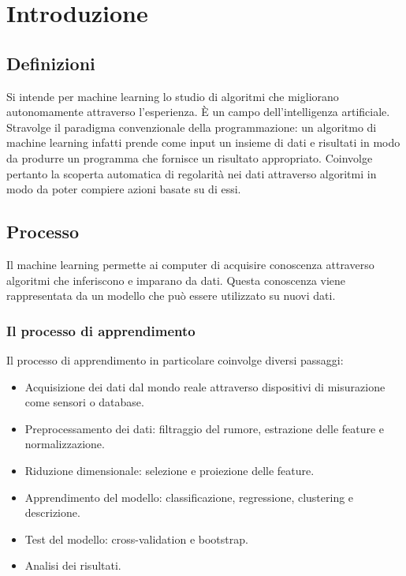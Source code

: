 \chapter{Introduzione}

\section{Definizioni}
Si intende per machine learning lo studio di algoritmi che migliorano autonomamente attraverso l'esperienza.
\`E un campo dell'intelligenza artificiale.
Stravolge il paradigma convenzionale della programmazione: un algoritmo di machine learning infatti prende come input un insieme di dati e risultati in modo da produrre un programma che fornisce un risultato appropriato.
Coinvolge pertanto la scoperta automatica di regolarit\`a nei dati attraverso algoritmi in modo da poter compiere azioni basate su di essi.

\section{Processo}
Il machine learning permette ai computer di acquisire conoscenza attraverso algoritmi che inferiscono e imparano da dati.
Questa conoscenza viene rappresentata da un modello che pu\`o essere utilizzato su nuovi dati.

	\subsection{Il processo di apprendimento}
	Il processo di apprendimento in particolare coinvolge diversi passaggi:
	\begin{multicols}{2}
		\begin{itemize}
			\item Acquisizione dei dati dal mondo reale attraverso dispositivi di misurazione come sensori o database.
			\item Preprocessamento dei dati: filtraggio del rumore, estrazione delle feature e normalizzazione.
			\item Riduzione dimensionale: selezione e proiezione delle feature.
			\item Apprendimento del modello: classificazione, regressione, clustering e descrizione.
			\item Test del modello: cross-validation e bootstrap.
			\item Analisi dei risultati.
		\end{itemize}
	\end{multicols}

